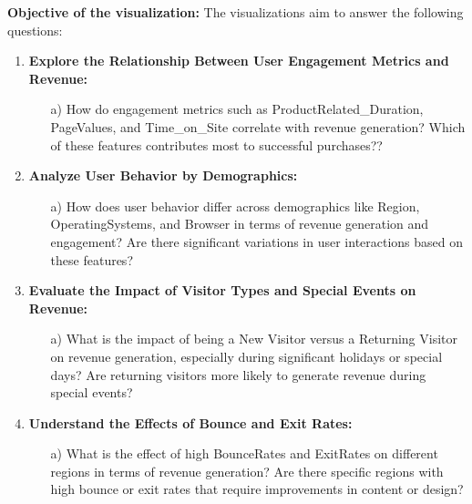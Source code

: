 \documentclass[12pt]{article}
\begin{document}
\vspace{0.5cm}

\textbf{Objective of the visualization:} The visualizations aim to answer the following questions:

\begin{enumerate}
    \item \textbf{Explore the Relationship Between User Engagement Metrics and Revenue:}
    
    \begin{enumerate}
        \item[a)] How do engagement metrics such as ProductRelated\_Duration, PageValues, and Time\_on\_Site correlate with revenue generation? Which of these features contributes most to successful purchases??
    \end{enumerate}

    \item \textbf{Analyze User Behavior by Demographics:}
    
    \begin{enumerate}
        \item[a)] How does user behavior differ across demographics like Region, OperatingSystems, and Browser in terms of revenue generation and engagement? Are there significant variations in user interactions based on these features?

    \end{enumerate}
    
    
    \item \textbf{Evaluate the Impact of Visitor Types and Special Events on Revenue:}
    
    \begin{enumerate}
        \item[a)] What is the impact of being a New Visitor versus a Returning Visitor on revenue generation, especially during significant holidays or special days? Are returning visitors more likely to generate revenue during special events?

    \end{enumerate}

    \item \textbf{Understand the Effects of Bounce and Exit Rates:}
    
    \begin{enumerate}
        \item[a)] What is the effect of high BounceRates and ExitRates on different regions in terms of revenue generation? Are there specific regions with high bounce or exit rates that require improvements in content or design?



\end{enumerate}
\end{enumerate}
\end{document}
